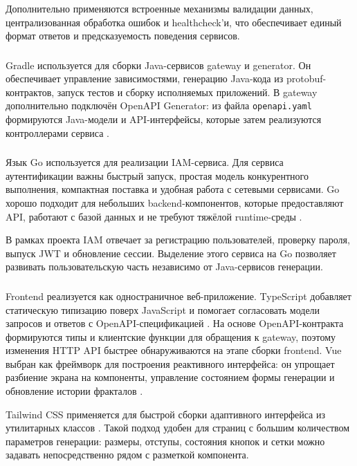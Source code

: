 Дополнительно применяются встроенные механизмы валидации данных, централизованная обработка ошибок и healthcheck'и, что обеспечивает единый формат ответов и предсказуемость поведения сервисов.

\subsubsection{}

Gradle используется для сборки Java-сервисов gateway и generator. Он обеспечивает управление зависимостями, генерацию Java-кода из protobuf-контрактов, запуск тестов и сборку исполняемых приложений. В gateway дополнительно подключён OpenAPI Generator: из файла \texttt{openapi.yaml} формируются Java-модели и API-интерфейсы, которые затем реализуются контроллерами сервиса \cite{gradle}.

\subsubsection{}

Язык Go используется для реализации IAM-сервиса. Для сервиса аутентификации важны быстрый запуск, простая модель конкурентного выполнения, компактная поставка и удобная работа с сетевыми сервисами. Go хорошо подходит для небольших backend-компонентов, которые предоставляют API, работают с базой данных и не требуют тяжёлой runtime-среды \cite{go}.

В рамках проекта IAM отвечает за регистрацию пользователей, проверку пароля, выпуск JWT и обновление сессии. Выделение этого сервиса на Go позволяет развивать пользовательскую часть независимо от Java-сервисов генерации.

\subsubsection{}

Frontend реализуется как одностраничное веб-приложение. TypeScript добавляет статическую типизацию поверх JavaScript и помогает согласовать модели запросов и ответов с OpenAPI-спецификацией \cite{typescript}. На основе OpenAPI-контракта формируются типы и клиентские функции для обращения к gateway, поэтому изменения HTTP API быстрее обнаруживаются на этапе сборки frontend. Vue выбран как фреймворк для построения реактивного интерфейса: он упрощает разбиение экрана на компоненты, управление состоянием формы генерации и обновление истории фракталов \cite{vue}.

Tailwind CSS применяется для быстрой сборки адаптивного интерфейса из утилитарных классов \cite{tailwind}. Такой подход удобен для страниц с большим количеством параметров генерации: размеры, отступы, состояния кнопок и сетки можно задавать непосредственно рядом с разметкой компонента.

